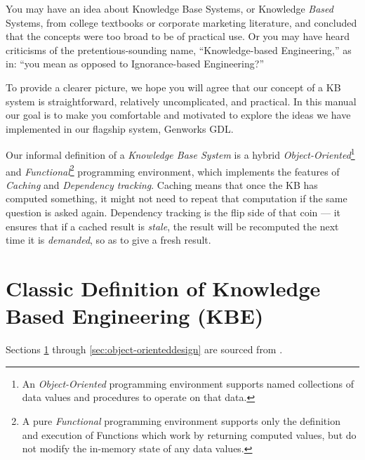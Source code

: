 \documentclass [11pt]{book}
\begin{document}
\label{sec:knowledgebaseconceptsaccordingtogenworks}

You may have an idea about Knowledge Base Systems,
or Knowledge \emph{Based} Systems, from college textbooks or corporate marketing
literature, and concluded that the concepts were too broad to be of
practical use. Or you may have heard criticisms of the
pretentious-sounding name, ``Knowledge-based Engineering,'' as in:
``you mean as opposed to Ignorance-based Engineering?'' 

To provide a clearer picture, we hope you will agree that our concept
of a KB system is straightforward, relatively uncomplicated, and
practical. In this manual  our goal is to make you comfortable
and motivated to explore the ideas we have implemented in our flagship
system, Genworks GDL.

Our informal definition of a \emph{Knowledge Base System} is a hybrid \emph{Object-Oriented}\footnote{An \emph{Object-Oriented} programming environment supports named collections of data values and procedures to operate on that data.} and \emph{Functional}\footnote{A pure \emph{Functional} programming environment supports only the definition and execution of Functions which work by returning
computed values, but do not modify the in-memory state of any data values.} programming environment, which implements the features of \emph{Caching} and \emph{Dependency tracking}. Caching means that once the KB has computed something, it might not need to repeat 
that computation if the same question is asked again. Dependency tracking is the flip side
of that coin --- it ensures that if a cached result is \emph{stale}, the result will be recomputed the next time it is \emph{demanded}, so as to give a fresh result.

\section{Classic Definition of Knowledge Based Engineering (KBE)}

\label{sec:classicdefinitionofknowledgebasedengineering(kbe)}

Sections 
\ref{sec:classicdefinitionofknowledgebasedengineering(kbe)} through 
\ref{sec:object-orienteddesign} are sourced from 
\cite{LaRocca}.
\end{document}
